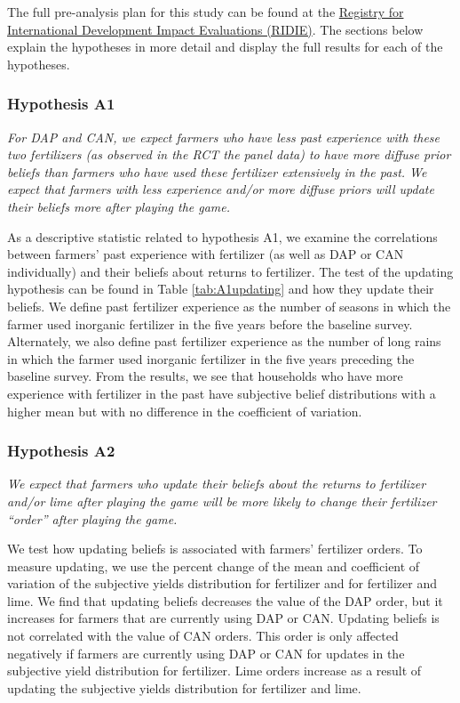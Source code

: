 \documentclass[12pt,letterpaper]{article}
\begin{document}
The full pre-analysis plan for this study can be found at the \href{http://ridie.3ieimpact.org/index.php?r=search/detailView&id=528}{Registry for International Development Impact Evaluations (RIDIE)}. The sections below explain the hypotheses in more detail and display the full results for each of the hypotheses. 








\subsubsection*{Hypothesis A1}
\textit{For DAP and CAN, we expect farmers who have less past experience with these two fertilizers (as observed in the RCT the panel data) to have more diffuse prior beliefs than farmers who have used these fertilizer extensively in the past. We expect that farmers with less
experience and/or more diffuse priors will update their beliefs more after playing the game.} 

As a descriptive statistic related to hypothesis A1, we examine the correlations between farmers' past experience with fertilizer (as well as DAP or CAN individually) and their beliefs about returns to fertilizer. The test of the updating hypothesis can be found in Table \ref{tab:A1updating} and how they update their beliefs.  We define past fertilizer experience as the number of seasons in which the farmer used inorganic fertilizer in the five years before the baseline survey. Alternately, we also define past fertilizer experience as the number of long rains in which the farmer used inorganic fertilizer in the five years preceding the baseline survey.
From the results, we see that households who have more experience with fertilizer in the past have subjective belief distributions with a higher mean but with no difference in the coefficient of variation.  



\newpage
\subsubsection*{Hypothesis A2}
\textit{We expect that farmers who update their beliefs about the returns to fertilizer and/or lime after playing the game will be more likely to change their fertilizer “order” after playing the game.} 

We test how updating beliefs is associated with farmers' fertilizer orders. To measure updating, we use the percent change of the mean and coefficient of variation of the subjective yields distribution for fertilizer and for fertilizer and lime. We find that updating beliefs decreases the value of the DAP order, but it increases for farmers that are currently using DAP or CAN. Updating beliefs is not correlated with the value of CAN orders. This order is only affected negatively if farmers are currently using DAP or CAN for updates in the subjective yield distribution for fertilizer. Lime orders increase as a result of updating the subjective yields distribution for fertilizer and lime. 
\end{document}
